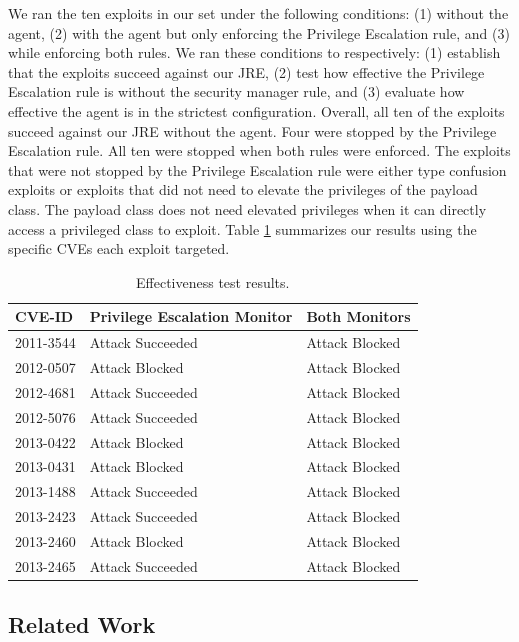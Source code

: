 \documentclass{sig-alternate}
\begin{document}
We ran the ten exploits in our set under the following conditions:
(1) without the agent, (2) with the agent but only enforcing the Privilege
Escalation rule, and (3) while enforcing both rules. We ran these
conditions to respectively: (1) establish that the exploits succeed
against our JRE, (2) test how effective the Privilege Escalation rule
is without the security manager rule, and (3) evaluate how effective
the agent is in the strictest configuration. Overall, all
ten of the exploits succeed against our JRE without the agent. Four
were stopped by the Privilege Escalation rule. All ten were stopped
when both rules were enforced. The exploits that were not stopped
by the Privilege Escalation rule were either type confusion exploits
or exploits that did not need to elevate the privileges of the payload
class. The payload class does not need elevated privileges when it
can directly access a privileged class to exploit. Table \ref{tab:Exploit-experiment-summary}
summarizes our results using the specific CVEs each exploit targeted.

\begin{table}
\protect\caption{Effectiveness test results.}\label{tab:Exploit-experiment-summary}


\centering{}%
\begin{tabular}{l>{\raggedright}p{3cm}l}
\toprule 
\textbf{CVE-ID} & \textbf{Privilege Escalation Monitor} & \textbf{Both Monitors}\tabularnewline
\midrule
2011-3544 & Attack Succeeded  & Attack Blocked\tabularnewline
2012-0507 & Attack Blocked & Attack Blocked\tabularnewline
2012-4681 & Attack Succeeded  & Attack Blocked\tabularnewline
2012-5076 & Attack Succeeded  & Attack Blocked\tabularnewline
2013-0422 & Attack Blocked & Attack Blocked\tabularnewline
2013-0431 & Attack Blocked & Attack Blocked\tabularnewline
2013-1488 & Attack Succeeded  & Attack Blocked\tabularnewline
2013-2423 & Attack Succeeded  & Attack Blocked\tabularnewline
2013-2460 & Attack Blocked & Attack Blocked\tabularnewline
2013-2465 & Attack Succeeded  & Attack Blocked\tabularnewline
\bottomrule
\end{tabular}
\end{table}

\subsection{Related Work}\label{sub:Related-Work-Mitigation}
\end{document}
